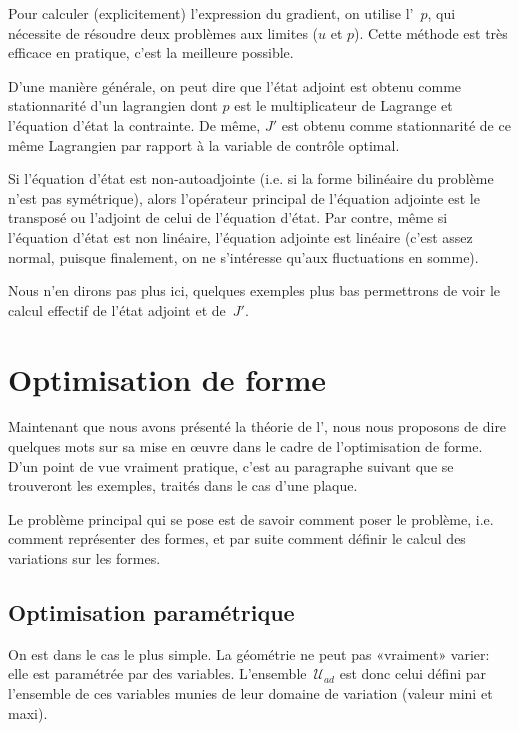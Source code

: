 \medskip
Pour calculer (explicitement) l'expression du gradient, on utilise l'~$p$, qui nécessite de résoudre deux problèmes aux limites ($u$ et $p$).
Cette méthode est très efficace en pratique, c'est la meilleure possible.

D'une manière générale, on peut dire que l'état adjoint est obtenu comme stationnarité d'un lagrangien dont $p$ est le multiplicateur de Lagrange et l'équation d'état la contrainte.
De même, $J'$ est obtenu comme stationnarité de ce même Lagrangien par rapport à la variable de contrôle optimal.

Si l'équation d'état est non-autoadjointe (i.e. si la forme bilinéaire du problème n'est pas symétrique), alors l'opérateur principal de l'équation adjointe est le transposé ou l'adjoint de celui de l'équation d'état.
Par contre, même si l'équation d'état est non linéaire, l'équation adjointe est linéaire (c'est assez normal, puisque finalement, on ne s'intéresse qu'aux fluctuations en somme).

Nous n'en dirons pas plus ici, quelques exemples plus bas permettrons de voir le calcul effectif de l'état adjoint et de~$J'$.


\medskip
\section{Optimisation de forme}

Maintenant que nous avons présenté la théorie de l', nous nous proposons de dire quelques mots sur sa mise en œuvre dans le cadre de l'optimisation de forme. D'un point de vue vraiment pratique, c'est au paragraphe suivant que se trouveront les exemples, traités dans le cas d'une plaque.

\medskip
Le problème principal qui se pose est de savoir comment poser le problème, i.e. comment représenter des formes, et par suite comment définir le calcul des variations sur les formes.

\medskip
\subsection{Optimisation paramétrique}

On est dans le cas le plus simple. La géométrie ne peut pas «vraiment» varier: elle est paramétrée par des variables. L'ensemble~$\mathcal{U}_{ad}$ est donc celui défini par l'ensemble de ces variables munies de leur domaine de variation (valeur mini et maxi).

